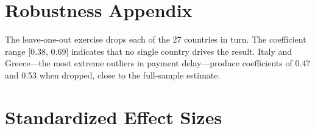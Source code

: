 \documentclass[12pt]{article}
\begin{document}
\section{Robustness Appendix}
\label{app:robustness}

The leave-one-out exercise drops each of the 27 countries in turn. The coefficient range [0.38, 0.69] indicates that no single country drives the result. Italy and Greece---the most extreme outliers in payment delay---produce coefficients of 0.47 and 0.53 when dropped, close to the full-sample estimate.

\section{Standardized Effect Sizes}
\label{sec:sde}


\end{document}
